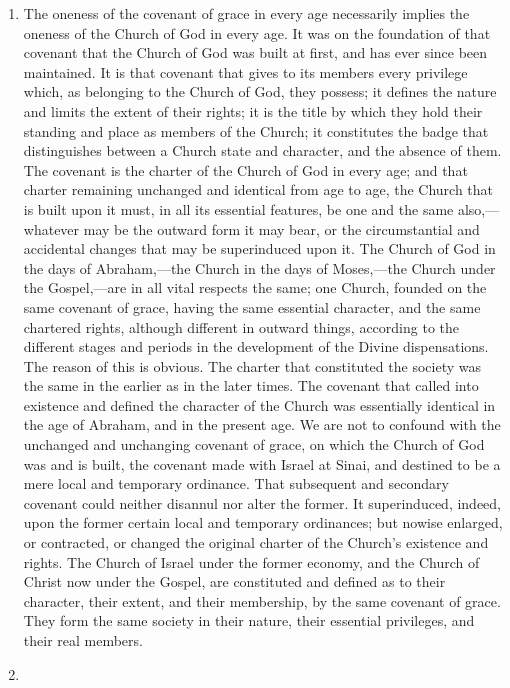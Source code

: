 \documentclass[]{book}
\begin{document}
\begin{enumerate}
\def\labelenumi{\arabic{enumi}.}
\item
  The oneness of the covenant of grace in every age necessarily implies the oneness of the Church of God in every age. It was on the foundation of that covenant that the Church of God was built at first, and has ever since been maintained. It is that covenant that gives to its members every privilege which, as belonging to the Church of God, they possess; it defines the nature and limits the extent of their rights; it is the title by which they hold their standing and place as members of the Church; it constitutes the badge that distinguishes between a Church state and character, and the absence of them. The covenant is the charter of the Church of God in every age; and that charter remaining unchanged and identical from age to age, the Church that is built upon it must, in all its essential features, be one and the same also,---whatever may be the outward form it may bear, or the circumstantial and accidental changes that may be superinduced upon it. The Church of God in the days of Abraham,---the Church in the days of Moses,---the Church under the Gospel,---are in all vital respects the same; one Church, founded on the same covenant of grace, having the same essential character, and the same chartered rights, although different in outward things, according to the different stages and periods in the development of the Divine dispensations. The reason of this is obvious. The charter that constituted the society was the same in the earlier as in the later times. The covenant that called into existence and defined the character of the Church was essentially identical in the age of Abraham, and in the present age. We are not to confound with the unchanged and unchanging covenant of grace, on which the Church of God was and is built, the covenant made with Israel at Sinai, and destined to be a mere local and temporary ordinance. That subsequent and secondary covenant could neither disannul nor alter the former. It superinduced, indeed, upon the former certain local and temporary ordinances; but nowise enlarged, or contracted, or changed the original charter of the Church's existence and rights. The Church of Israel under the former economy, and the Church of Christ now under the Gospel, are constituted and defined as to their character, their extent, and their membership, by the same covenant of grace. They form the same society in their nature, their essential privileges, and their real members.
\item

\end{enumerate}
\end{document}
